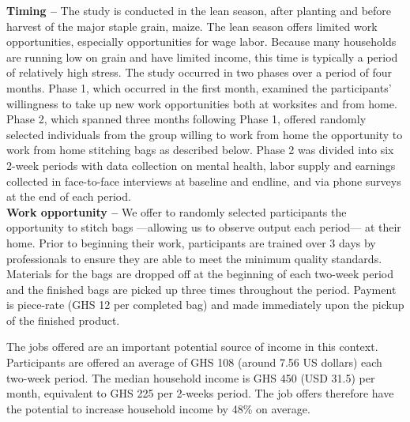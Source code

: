 \documentclass[12pt, a4paper, american]{article}
\begin{document}
\textbf{Timing --} The study is conducted in the lean season, after planting and before harvest of the major staple grain, maize. The lean season offers limited work opportunities, especially opportunities for wage labor. Because many households are running low on grain and have limited income, this time is typically a period of relatively high stress. 
The study occurred in two phases over a period of four months. Phase 1, which occurred in the first month, examined the participants' willingness to take up new work opportunities both at worksites and from home. Phase 2, which spanned three months following Phase 1, offered randomly selected individuals from the group willing to work from home the opportunity to work from home stitching bags as described below. Phase 2 was divided into six 2-week periods with data collection on mental health, labor supply and earnings collected in face-to-face interviews at baseline and endline, and via phone surveys at the end of each period. \\

\textbf{Work opportunity --} We offer to randomly selected participants the opportunity to stitch bags ---allowing us to observe output each period--- at their home. Prior to beginning their work, participants are trained over 3 days by professionals to ensure they are able to meet the minimum quality standards. Materials for the bags are dropped off at the beginning of each two-week period and the finished bags are picked up three times throughout the period. Payment is piece-rate (GHS 12 per completed bag) and made immediately upon the pickup of the finished product. 

The jobs offered are an important potential source of income in this context. Participants are offered an average of GHS 108 (around 7.56 US dollars) each two-week period. The median household income is GHS 450 (USD 31.5) per month, equivalent to GHS 225 per 2-weeks period. The job offers therefore have the potential to increase household income by 48\% on average. \\
\end{document}
